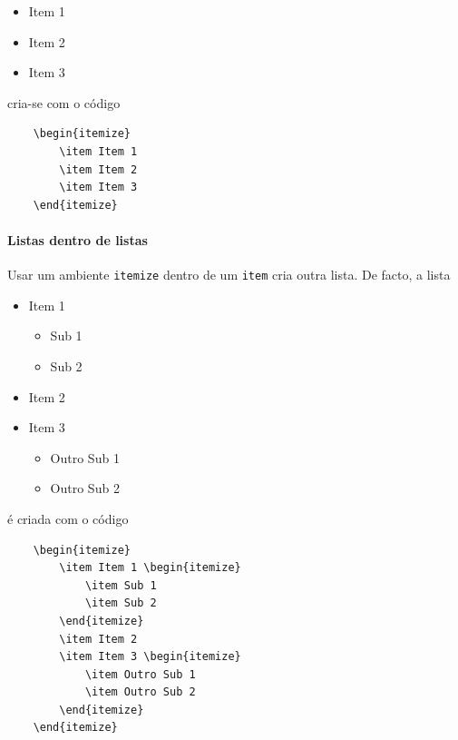 \documentclass[11pt]{article}
\begin{document}
\begin{itemize}
    \item Item 1
    \item Item 2
    \item Item 3
\end{itemize}

cria-se com o código

\begin{verbatim}
    \begin{itemize}
        \item Item 1
        \item Item 2
        \item Item 3
    \end{itemize}
\end{verbatim}

\paragraph{Listas dentro de listas}
Usar um ambiente \texttt{itemize} dentro de um \texttt{item} cria outra lista.
De facto, a lista

\begin{itemize}
    \item Item 1 \begin{itemize}
        \item Sub 1
        \item Sub 2
    \end{itemize}
    \item Item 2
    \item Item 3 \begin{itemize}
        \item Outro Sub 1
        \item Outro Sub 2
    \end{itemize}
\end{itemize}

é criada com o código

\begin{verbatim}
    \begin{itemize}
        \item Item 1 \begin{itemize}
            \item Sub 1
            \item Sub 2
        \end{itemize}
        \item Item 2
        \item Item 3 \begin{itemize}
            \item Outro Sub 1
            \item Outro Sub 2
        \end{itemize}
    \end{itemize}
\end{verbatim}
\end{document}
